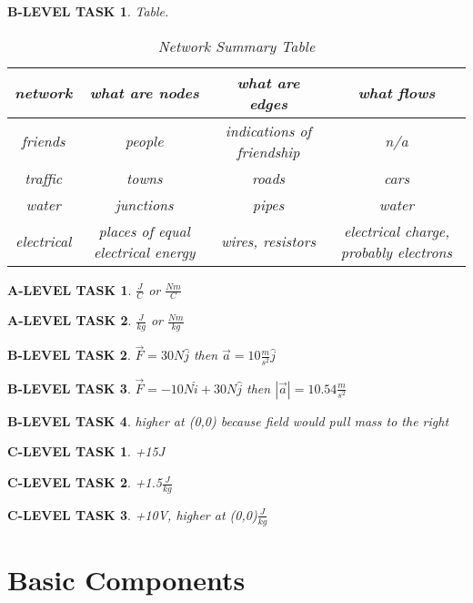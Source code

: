 \documentclass{book}
\numberwithin{equation}{section}
\newtheorem{alevel}{A-LEVEL TASK}
\newtheorem{blevel}{B-LEVEL TASK}
\newtheorem{clevel}{C-LEVEL TASK}
\theoremstyle{definition}
\begin{document}
\begin{blevel} Table.\par
\begin{table}[H]
\begin{center}
\begin{tabular}{ |c | c | c | c |} \hline
network	&	what are nodes	& what are edges	& what flows \\ \hline
friends	&	people	& indications of friendship	& n/a \\ \hline
traffic &	towns	& roads				&cars	\\ \hline
water	&	junctions	& pipes				&water	\\ \hline
electrical	& places of equal electrical energy	& wires, resistors	&electrical charge, probably electrons	\\ \hline
\end{tabular}
\caption{Network Summary Table}
\end{center}
\end{table}
\end{blevel}

\begin{alevel}$\frac{J}{C}$ or $\frac{Nm}{C}$\end{alevel}
\begin{alevel}$\frac{J}{kg}$ or $\frac{Nm}{kg}$\end{alevel}
\begin{blevel}$\vec{F}=30N\hat{j}$ then $\vec{a}=10\frac{m}{s^2}\hat{j}$\end{blevel}
\begin{blevel}$\vec{F}=-10N\hat{i}+30N\hat{j}$ then $|\vec{a}|=10.54\frac{m}{s^2}$\end{blevel}
\begin{blevel}higher at (0,0) because field would pull mass to the right\end{blevel}
\begin{clevel}+15J\end{clevel}
\begin{clevel}+1.5$\frac{J}{kg}$\end{clevel}
\begin{clevel}+10V, higher at (0,0)$\frac{J}{kg}$\end{clevel}

\setcounter{alevel}{0} \setcounter{blevel}{0} \setcounter{clevel}{0} \setcounter{dlevel}{0}
\chapter{Basic Components}
\end{document}
